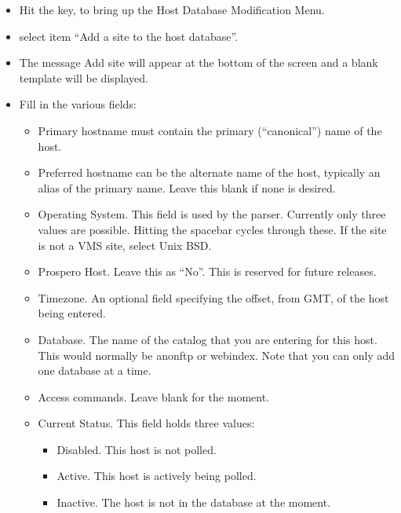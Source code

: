 \begin{itemize}
\item Hit the  key, to bring up the Host Database Modification Menu.

\item select item ``Add a site to the host database''.

\item The message Add site will appear at the bottom of the screen and a blank
template will be displayed.

\item Fill in the various fields:

\begin{itemize}
\item Primary hostname must contain the primary (``canonical'') name of the
host. 

\item Preferred hostname can be the alternate name of the host, typically an
alias of the primary name. Leave this blank if none is desired.

\item Operating System. This field is used by the parser. Currently only three
values are possible. Hitting the spacebar cycles through these. If
the site is not a VMS site, select Unix BSD.

\item Prospero Host. Leave this as ``No''. This is reserved for future releases.

\item Timezone. An optional field specifying the offset, from GMT, of the host being
entered.

\item Database. The name of the catalog that you are entering for this host.
This would normally be anonftp or webindex. Note that you can only add one
database at a time.

\item Access commands. Leave blank for the moment.

\item Current Status. This field holds three values:

\begin{itemize}
\item Disabled. This host is not polled.

\item Active. This host is actively being polled.

\item Inactive. The host is not in the database at the moment.


\end{itemize}
\end{itemize}
\end{itemize}
